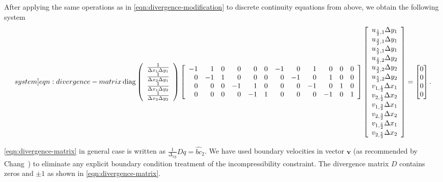 \documentclass{article}
\numberwithin{equation}{section}
\begin{document}
After applying the same operations as in \cref{eqn:divergence-modification} to discrete continuity equations from above, we obtain the following system
\begin{equation}\label[system]{eqn:divergence-matrix}
\operatorname{diag}\left(\begin{array}{cccc}
\frac{1}{\Delta x_1 \Delta y_1} \\
\frac{1}{\Delta x_2 \Delta y_1} \\
\frac{1}{\Delta x_1 \Delta y_2} \\
\frac{1}{\Delta x_2 \Delta y_2}
\end{array}\right)
\left[ \begin{array}{rrrrrrrrrrrr}
-1 & 1 & 0 & 0 & 0 & 0 & -1 & 0 & 1 & 0 & 0 & 0 \\
0 & -1 & 1 & 0 & 0 & 0 & 0 & -1 & 0 & 1 & 0 & 0 \\
0 & 0 & 0 & -1 & 1 & 0 & 0 & 0 & -1 & 0 & 1 & 0 \\
0 & 0 & 0 & 0 & -1 & 1 & 0 & 0 & 0 & -1 & 0 & 1
\end{array} \right]
\left[\begin{array}{l}
u_{\frac{1}{2},1} \Delta y_1 \\
u_{\frac{3}{2},1} \Delta y_1 \\
u_{\frac{5}{2},1} \Delta y_1 \\
u_{\frac{1}{2},2} \Delta y_2 \\
u_{\frac{3}{2},2} \Delta y_2 \\
u_{\frac{5}{2},2} \Delta y_2 \\
v_{1,\frac{1}{2}} \Delta x_1 \\
v_{2,\frac{1}{2}} \Delta x_2 \\
v_{1,\frac{3}{2}} \Delta x_1 \\
v_{2,\frac{3}{2}} \Delta x_2	 \\
v_{1,\frac{5}{2}} \Delta x_1 \\
v_{2,\frac{5}{2}} \Delta x_2 \\
\end{array}\right]=
\begin{bmatrix}{}
0 \\
0 \\
0 \\
0
\end{bmatrix}.
\end{equation}

\cref{eqn:divergence-matrix} in general case is written as $\frac{1}{\Delta_{xy}} D q=\hat{bc}_2$.
We have used boundary velocities in vector $\boldsymbol{v}$ (as recommended by Chang~\cite{Chang:2002}) to eliminate any explicit boundary condition treatment of the incompressibility constraint. The divergence matrix $D$ contains zeros and $\pm1$ as shown in \cref{eqn:divergence-matrix}.
\end{document}
